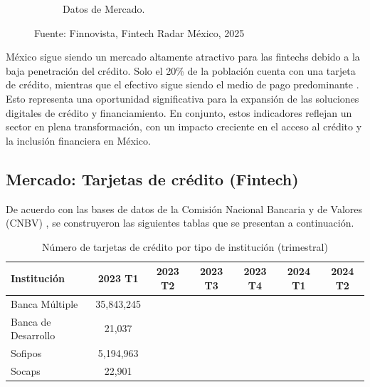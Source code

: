 \begin{figure}[h!]
\begin{subfigure}[b]{0.45\textwidth}
        \caption{Datos de Mercado.}
        \label{fig:datmerca}
    \end{subfigure}
    \caption{Fuente: Finnovista,  Fintech Radar México, 2025}
    \label{fig:figure1}
\end{figure}

México sigue siendo un mercado altamente atractivo para las fintechs debido a la baja penetración del crédito. Solo el 20\% de la población cuenta con una tarjeta de crédito, mientras que el efectivo sigue siendo el medio de pago predominante \cite{elfinanciero2024}. Esto representa una oportunidad significativa para la expansión de las soluciones digitales de crédito y financiamiento. En conjunto, estos indicadores reflejan un sector en plena transformación, con un impacto creciente en el acceso al crédito y la inclusión financiera en México.

\subsection*{Mercado: Tarjetas de crédito (Fintech)}
De acuerdo con las bases de datos de la Comisión Nacional Bancaria y de Valores (CNBV) \cite{cnbv_inclusion_2024}, se construyeron las siguientes tablas que se presentan a continuación.

\begin{table}[h!]
    \centering
    \caption{Número de tarjetas de crédito por tipo de institución (trimestral)}
    \begin{tabular}{lcccccc}
        \hline
        \textbf{Institución} & \textbf{2023 T1} & \textbf{2023 T2} & \textbf{2023 T3} & \textbf{2023 T4} & \textbf{2024 T1} & \textbf{2024 T2} \\
        \hline
        Banca Múltiple       &       35,843,245          &                 &                 &                 &                 &                 \\
        Banca de Desarrollo  &      21,037           &                 &                 &                 &                 &                 \\
        Sofipos              &         5,194,963        &                 &                 &                 &                 &                 \\
        Socaps               &      22,901           &                 &                 &                 &                 &                 \\
        \hline
    \end{tabular}
    \label{tab:creditos_trimestrales}
\end{table}

